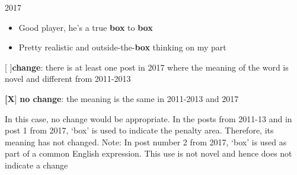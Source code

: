 \documentclass[11pt,a4paper]{article}
\begin{document}
\begin{minipage}{15cm}
\vspace*{0.25cm}

2017
\begin{itemize}
\item Good player, he’s a true \textbf{box} to \textbf{box}
\item Pretty realistic and outside-the-\textbf{box} thinking on my part
\end{itemize}

\vspace*{0.25cm}

[  ]\textbf{change}: there is at least one post in 2017 where the meaning of the word is novel and different from 2011-2013

\textbf{[X}] \textbf{no change}: the meaning is the same in 2011-2013 and 2017

\vspace*{0.25cm}

In this case, no change would be appropriate. In the posts from 2011-13 and in post 1 from 2017, `box' is used to indicate the penalty area. Therefore, its meaning has not changed. Note: In post number 2 from 2017, `box' is used as part of a common English expression. This use is not novel and hence does not indicate a change
\end{minipage}

\pagebreak

\clearpage


%
%
%
%
%
%
%
%




\end{document}
